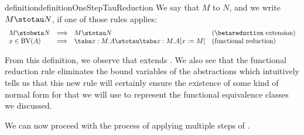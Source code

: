 \begin{reusable}{definition}{definitionOneStepTauReduction}
We say that $M$ \osteptaureduces to $N$, and we write $M \stotau N$, if one of those rules applies:
\[
\begin{array}{llll}
    M \stobeta N & \Longrightarrow & M \stotau N & \text{(\betareduction extension)} \\
    x \in \text{BV}(A) & \Longrightarrow & \tabs x:M.A \stotau \tabs x:M.A[x := M] & \text{(functional reduction)} \\
\end{array}
\]
\end{reusable}

From this definition, we observe that \taureduction extends \betareduction. We also see that the functional reduction rule eliminates the bound variables of the abstractions which intuitively tells us that this new rule will certainly ensure the existence of some kind of normal form for \taureduction that we will use to represent the functional equivalence classes we discussed.

We can now proceed with the process of applying multiple steps of \osteptaureduction.


